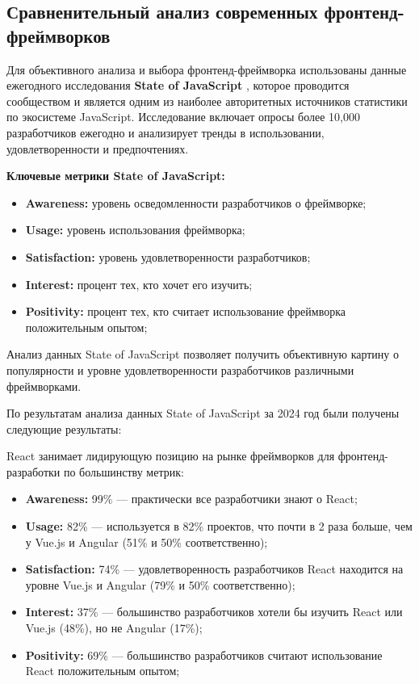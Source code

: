 \subsection{Сравненительный анализ современных фронтенд-фреймворков}
Для объективного анализа и выбора фронтенд-фреймворка использованы данные ежегодного 
исследования \textbf{State of JavaScript} \cite{state-of-javascript}, которое проводится сообществом и является
одним из наиболее авторитетных источников статистики по экосистеме JavaScript. Исследование
включает опросы более 10,000 разработчиков ежегодно и анализирует тренды в использовании,
удовлетворенности и предпочтениях.

\textbf{Ключевые метрики State of JavaScript:}
\begin{itemize}
	\item \textbf{Awareness:} уровень осведомленности разработчиков о фреймворке;
	\item \textbf{Usage:} уровень использования фреймворка;
	\item \textbf{Satisfaction:} уровень удовлетворенности разработчиков;
	\item \textbf{Interest:} процент тех, кто хочет его изучить;
	\item \textbf{Positivity:} процент тех, кто считает использование фреймворка положительным опытом;
\end{itemize}

Анализ данных State of JavaScript позволяет получить объективную картину о популярности и 
уровне удовлетворенности разработчиков различными фреймворками.

По результатам анализа данных State of JavaScript за 2024 год были получены следующие результаты:

React занимает лидирующую позицию на рынке фреймворков для фронтенд-разработки по большинству метрик:

\begin{itemize}
	\item \textbf{Awareness:} 99\% --- практически все разработчики знают о React;
	\item \textbf{Usage:} 82\% --- используется в 82\% проектов, что почти в 2 раза больше, чем у Vue.js и Angular (51\% и 50\% соответственно);
	\item \textbf{Satisfaction:} 74\% --- удовлетворенность разработчиков React находится на уровне Vue.js и Angular (79\% и 50\% соответственно);
	\item \textbf{Interest:} 37\% --- большинство разработчиков хотели бы изучить React или Vue.js (48\%), но не Angular (17\%);
	\item \textbf{Positivity:} 69\% --- большинство разработчиков считают использование React положительным опытом;
\end{itemize}


